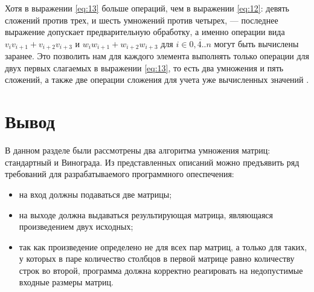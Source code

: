 Хотя в выражении \ref{eq:13} больше операций, чем в выражении \ref{eq:12}:
девять сложений против трех, и шесть умножений против четырех, --- последнее
выражение допускает предварительную обработку, а именно операции вида
$v_iv_{i+1}+v_{i+2}v_{i+3}$ и $w_iw_{i+1}+w_{i+2}w_{i+3}$ для $i \in
\overline{0,4..n}$ могут быть вычислены заранее. Это позволить нам для каждого
элемента выполнять только операции для двух первых слагаемых в выражении
\ref{eq:13}, то есть два умножения и пять сложений, а также две операции
сложения для учета уже вычисленных значений \cite{winograd} .

\section{Вывод}

В данном разделе были рассмотрены два алгоритма умножения матриц: стандартный
и Винограда. Из представленных описаний можно предъявить ряд требований для
разрабатываемого программного опеспечения:
\begin{itemize}[left=\parindent]
    \item на вход должны подаваться две матрицы;
    \item на выходе должна выдаваться результирующая матрица, являющаяся
          произведением двух исходных;
    \item так как произведение определено не для всех пар матриц, а только для
          таких, у которых в паре количество столбцов в первой матрице равно
          количеству строк во второй, программа должна корректно реагировать на
          недопустимые входные размеры матриц.
\end{itemize}
